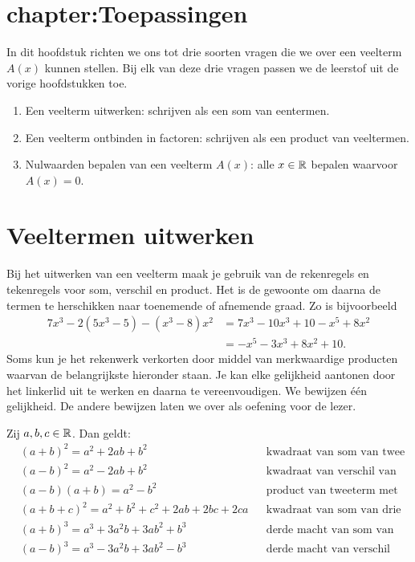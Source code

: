 \documentclass{ximera}
\begin{document}
\section{chapter:Toepassingen}

In dit hoofdstuk richten we ons tot drie soorten vragen die we over een veelterm $A(x)$ kunnen stellen. Bij elk van deze drie vragen passen we de leerstof uit de vorige hoofdstukken toe. 
\begin{enumerate}[(1)]
\item
Een veelterm uitwerken: schrijven als een som van eentermen. 
\item
Een veelterm ontbinden in factoren: schrijven als een product van veeltermen.
\item
Nulwaarden bepalen van een veelterm $A(x)$: alle $x \in \mathbb{R}$ bepalen waarvoor $A(x) = 0$. 
\end{enumerate}

\section{Veeltermen uitwerken}

Bij het uitwerken van een veelterm maak je gebruik van de rekenregels en tekenregels voor som, verschil en product. Het is de gewoonte om daarna de termen te herschikken naar toenemende of afnemende graad. Zo is bijvoorbeeld
\begin{align*}
7x^3-2(5x^3-5)-(x^3-8)x^2 & = 7x^3 - 10x^3 + 10 - x^5 + 8x^2 \\
& = -x^5 - 3x^3 + 8x^2 + 10.
\end{align*}
Soms kun je het rekenwerk verkorten door middel van merkwaardige producten
waarvan de belangrijkste hieronder staan. Je kan elke gelijkheid aantonen door het linkerlid uit te werken en daarna te vereenvoudigen. We bewijzen \'e\'en gelijkheid. De andere bewijzen laten we over als oefening voor de lezer. 

\begin{proposition} 
Zij $a,b,c \in \mathbb{R}$. Dan geldt:
\begin{align*}
& (a+b)^2 = a^2+2ab+b^2 && \text{kwadraat van som van twee termen} \\
& (a-b)^2 = a^2-2ab+b^2 && \text{kwadraat van verschil van twee termen} \\
& (a-b)(a+b) = a^2-b^2 && \text{product van tweeterm met zijn toegevoegde} \\
& (a+b+c)^2 = a^2 + b^2 + c^2 + 2ab + 2bc + 2ca && \text{kwadraat van som van drie termen} \\
& (a+b)^3 = a^3+3a^2b+3ab^2+b^3 && \text{derde macht van som van twee termen} \\
& (a-b)^3 = a^3-3a^2b+3ab^2-b^3 && \text{derde macht van verschil van twee termen.}
\end{align*}
\end{proposition} 
\end{document}
